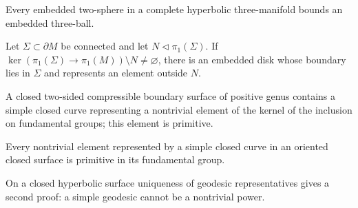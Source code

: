 \begin{lemma}
\label{lem:chow-iv-hyperbolic-irreducible}

Every embedded two-sphere in a complete hyperbolic three-manifold bounds an
embedded three-ball.
\end{lemma}

\begin{theorem}
\label{thm:chow-iv-loop-theorem}

Let \(\Sigma\subset\partial M\) be connected and let \(N\lhd\pi_1(\Sigma)\).
If \(\ker(\pi_1(\Sigma)\to\pi_1(M))\setminus N\ne\varnothing\), there is an
embedded disk whose boundary lies in \(\Sigma\) and represents an element
outside \(N\).
\end{theorem}

\begin{corollary}
\label{cor:chow-iv-compressible-boundary}


A closed two-sided compressible boundary surface of positive genus contains a
simple closed curve representing a nontrivial element of the kernel of the
inclusion on fundamental groups; this element is primitive.
\end{corollary}

\begin{lemma}
\label{lem:chow-iv-simple-curve-primitive}

Every nontrivial element represented by a simple closed curve in an oriented
closed surface is primitive in its fundamental group.
\end{lemma}

\begin{remark}
\label{rem:chow-iv-geodesic-primitivity}

On a closed hyperbolic surface uniqueness of geodesic representatives gives a
second proof: a simple geodesic cannot be a nontrivial power.
\end{remark}

